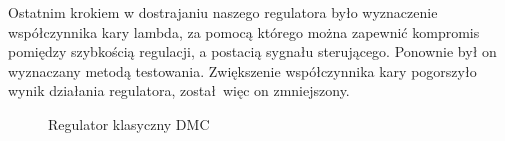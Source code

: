 Ostatnim krokiem w dostrajaniu naszego regulatora było wyznaczenie współczynnika kary lambda, 
za pomocą którego można zapewnić kompromis pomiędzy szybkością regulacji, a postacią sygnału sterującego. 
Ponownie był on wyznaczany metodą testowania. 
Zwiększenie współczynnika kary pogorszyło wynik działania regulatora, został więc on zmniejszony.



\begin{figure}[H] 
    \centering
    
    \caption{Regulator klasyczny DMC}
    \label{projekt:zad4::DMC1:figure}
\end{figure}


%     

%     

\newpage
